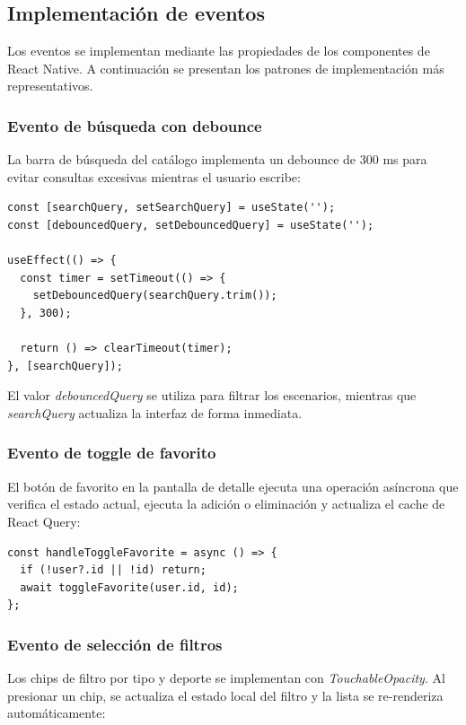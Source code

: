 \subsection{Implementaci\'on de eventos}

Los eventos se implementan mediante las propiedades de los componentes de
React Native. A continuaci\'on se presentan los patrones de implementaci\'on
m\'as representativos.

\subsubsection{Evento de b\'usqueda con debounce}

La barra de b\'usqueda del cat\'alogo implementa un debounce de 300 ms para
evitar consultas excesivas mientras el usuario escribe:

\begin{lstlisting}
const [searchQuery, setSearchQuery] = useState('');
const [debouncedQuery, setDebouncedQuery] = useState('');

useEffect(() => {
  const timer = setTimeout(() => {
    setDebouncedQuery(searchQuery.trim());
  }, 300);

  return () => clearTimeout(timer);
}, [searchQuery]);
\end{lstlisting}

El valor \textit{debouncedQuery} se utiliza para filtrar los escenarios,
mientras que \textit{searchQuery} actualiza la interfaz de forma inmediata.

\subsubsection{Evento de toggle de favorito}

El bot\'on de favorito en la pantalla de detalle ejecuta una operaci\'on
as\'incrona que verifica el estado actual, ejecuta la adici\'on o
eliminaci\'on y actualiza el cache de React Query:

\begin{lstlisting}
const handleToggleFavorite = async () => {
  if (!user?.id || !id) return;
  await toggleFavorite(user.id, id);
};
\end{lstlisting}

\subsubsection{Evento de selecci\'on de filtros}

Los chips de filtro por tipo y deporte se implementan con
\textit{TouchableOpacity}. Al presionar un chip, se actualiza el estado
local del filtro y la lista se re-renderiza autom\'aticamente:

